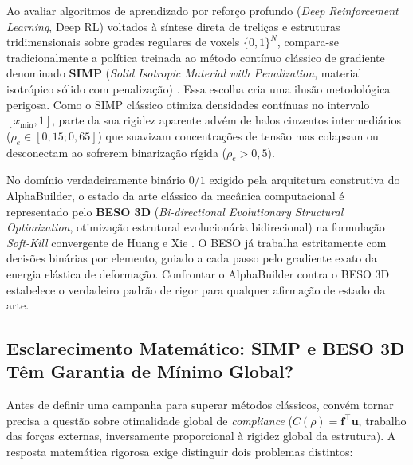\documentclass[11pt,a4paper]{article}
\begin{document}
Ao avaliar algoritmos de aprendizado por reforço profundo (\textit{Deep Reinforcement Learning}, Deep RL) voltados à síntese direta de treliças e estruturas tridimensionais sobre grades regulares de voxels $\{0,1\}^N$, compara-se tradicionalmente a política treinada ao método contínuo clássico de gradiente denominado \textbf{SIMP} (\textit{Solid Isotropic Material with Penalization}, material isotrópico sólido com penalização) \cite{bendsoe2003topology, sigmund200199line, liu2014efficient}. Essa escolha cria uma ilusão metodológica perigosa. Como o SIMP clássico otimiza densidades contínuas no intervalo $[x_{\min}, 1]$, parte da sua rigidez aparente advém de halos cinzentos intermediários ($\rho_e \in [0{,}15; 0{,}65]$) que suavizam concentrações de tensão mas colapsam ou desconectam ao sofrerem binarização rígida ($\rho_e > 0{,}5$).

No domínio verdadeiramente binário $0/1$ exigido pela arquitetura construtiva do AlphaBuilder, o estado da arte clássico da mecânica computacional é representado pelo \textbf{BESO 3D} (\textit{Bi-directional Evolutionary Structural Optimization}, otimização estrutural evolucionária bidirecional) na formulação \textit{Soft-Kill} convergente de Huang e Xie \cite{huang2007convergent, huang2010evolutionary}. O BESO já trabalha estritamente com decisões binárias por elemento, guiado a cada passo pelo gradiente exato da energia elástica de deformação. Confrontar o AlphaBuilder contra o BESO 3D estabelece o verdadeiro padrão de rigor para qualquer afirmação de estado da arte.

\subsection{Esclarecimento Matemático: SIMP e BESO 3D Têm Garantia de Mínimo Global?}

Antes de definir uma campanha para superar métodos clássicos, convém tornar precisa a questão sobre otimalidade global de \textit{compliance} ($C(\rho) = \mathbf{f}^\top \mathbf{u}$, trabalho das forças externas, inversamente proporcional à rigidez global da estrutura). A resposta matemática rigorosa exige distinguir dois problemas distintos:
\end{document}
